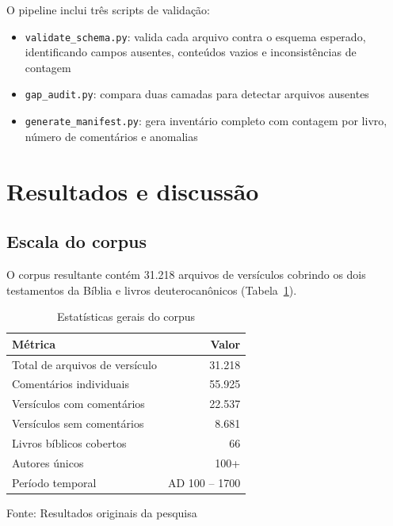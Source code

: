\documentclass[11pt,a4paper]{article}
\begin{document}
O pipeline inclui tr\^{e}s scripts de valida\c{c}\~{a}o:

\begin{itemize}[leftmargin=1.25cm]
\item \texttt{validate\_schema.py}: valida cada arquivo contra o esquema esperado, identificando campos ausentes, conte\'{u}dos vazios e inconsist\^{e}ncias de contagem
\item \texttt{gap\_audit.py}: compara duas camadas para detectar arquivos ausentes
\item \texttt{generate\_manifest.py}: gera invent\'{a}rio completo com contagem por livro, n\'{u}mero de coment\'{a}rios e anomalias
\end{itemize}

\section{Resultados e discuss\~{a}o}

\subsection{Escala do corpus}

O corpus resultante cont\'{e}m 31.218 arquivos de vers\'{i}culos cobrindo os dois testamentos da B\'{i}blia e livros deuterocan\^{o}nicos (Tabela~\ref{tab:stats}).

\begin{table}[H]
\centering
\caption{Estat\'{i}sticas gerais do corpus}
\label{tab:stats}
\begin{tabularx}{0.75\textwidth}{Xr}
\toprule
M\'{e}trica & Valor \\
\midrule
Total de arquivos de vers\'{i}culo & 31.218 \\
Coment\'{a}rios individuais & 55.925 \\
Vers\'{i}culos com coment\'{a}rios & 22.537 \\
Vers\'{i}culos sem coment\'{a}rios & 8.681 \\
Livros b\'{i}blicos cobertos & 66 \\
Autores \'{u}nicos & 100+ \\
Per\'{i}odo temporal & AD 100 -- 1700 \\
\bottomrule
\end{tabularx}

Fonte: Resultados originais da pesquisa
\end{table}
\end{document}
